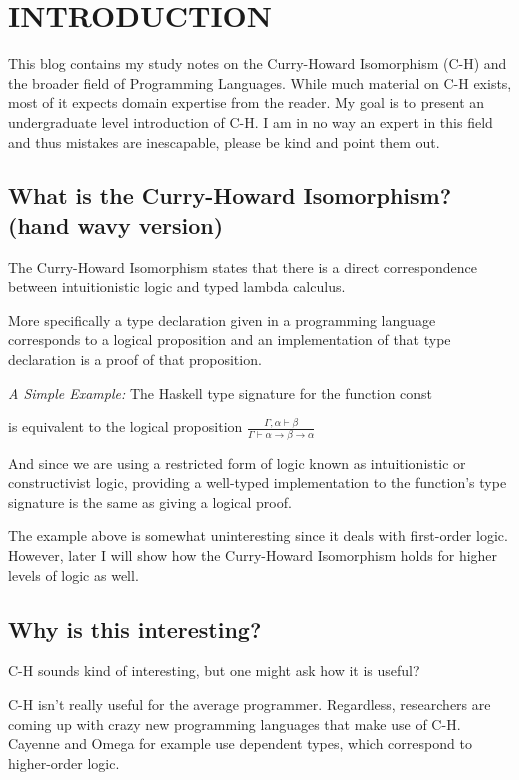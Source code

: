 \chapter{INTRODUCTION}\label{ch:intro}
This blog contains my study notes on the Curry-Howard Isomorphism (C-H) and the broader field of Programming Languages. While much material on C-H exists, most of it expects domain expertise from the reader. My goal is to present an undergraduate level introduction of C-H. I am in no way an expert in this field and thus mistakes are inescapable, please be kind and point them out.


\section{What is the Curry-Howard Isomorphism? (hand wavy version)}
The Curry-Howard Isomorphism states that there is a direct correspondence between intuitionistic logic and typed lambda calculus.

More specifically a type declaration given in a programming language corresponds to a logical proposition and an implementation of that type declaration is a proof of that proposition.

\emph{A Simple Example:}
The Haskell type signature for the function const

is equivalent to the logical proposition $\frac{\Gamma, \alpha \vdash \beta}{\Gamma \vdash \alpha \rightarrow \beta \rightarrow \alpha}$

And since we are using a restricted form of logic known as intuitionistic or constructivist logic, providing a well-typed implementation to the function's type signature is the same as giving a logical proof.

The example above is somewhat uninteresting since it deals with first-order logic. However, later I will show how the Curry-Howard Isomorphism holds for higher levels of logic as well.

\section{Why is this interesting?}
C-H sounds kind of interesting, but one might ask how it is useful?

C-H isn't really useful for the average programmer. Regardless, researchers are coming up with crazy new programming languages that make use of C-H. Cayenne and Omega for example use dependent types, which correspond to higher-order logic.


